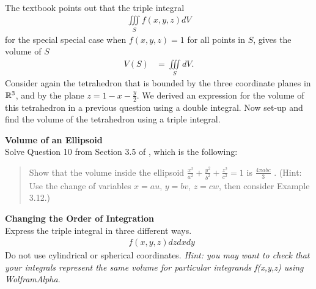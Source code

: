 \BEN
\item %
 \\
The textbook points out that the triple integral 
\begin{align*}
  \iiint\limits_S f(x,y,z) dV
\end{align*}
for the special special case when $f(x,y,z) = 1$ for all points in $S$, gives the volume of $S$
\begin{align*}
  V(S) &= \iiint\limits_S dV.
\end{align*}
Consider again the tetrahedron that is bounded by the three coordinate planes in $\mathbb{R}^3$, and by the plane $z = 1 - x - \frac{y}{2}$. We derived an expression for the volume of this tetrahedron in a previous question using a double integral. Now set-up and find the volume of the tetrahedron using a triple integral.
\item %
\textbf{Volume of an Ellipsoid}\\
Solve Question 10 from Section 3.5 of \VCT, which is the following: 
\begin{quotation}
\noindent
Show that the volume inside the ellipsoid $\frac{x^2}{a^2} + \frac{y^2}{b^2} + \frac{z^2}{c^2} = 1$ is $\frac{4\pi abc}{3}$ . (Hint: Use the
change of variables $x = au$, $y = bv$, $z = cw$, then consider Example 3.12.)
\end{quotation}

\item %
\textbf{Changing the Order of Integration}\\
Express the triple integral in three different ways. 
\begin{align*}
  \mathop{\int_{0}^{2} \! \int_0^{1-y/2} \int_0^{1-x-y/2} } f(x,y,z) dzdxdy
\end{align*}
Do not use cylindrical or spherical coordinates. \textit{Hint: you may want to check that your integrals represent the same volume for particular integrands f(x,y,z) using WolframAlpha}.

\EEN %
\newpage

